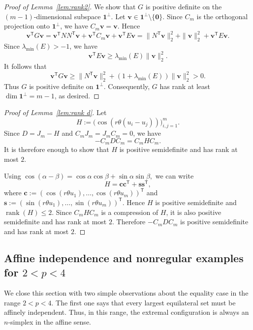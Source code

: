 \documentclass[11pt]{article}
\theoremstyle{definition}
\begin{document}
\begin{proof}[Proof of Lemma~\ref{lem:rank2}]
We show that \(G\) is positive definite on the \((m-1)\)-dimensional subspace \(\boldsymbol{1}^{\perp}\). Let
\(
\boldsymbol{v}\in\boldsymbol{1}^{\perp}\setminus\{\boldsymbol{0}\}.
\)
Since \(C_m\) is the orthogonal projection onto \(\boldsymbol{1}^{\perp}\), we have \(C_m\boldsymbol{v}=\boldsymbol{v}\). Hence
\[
\boldsymbol{v}^{\mathsf T}G\boldsymbol{v}
=
\boldsymbol{v}^{\mathsf T}NN^{\mathsf T}\boldsymbol{v}
+\boldsymbol{v}^{\mathsf T}C_m\boldsymbol{v}
+\boldsymbol{v}^{\mathsf T}E\boldsymbol{v}
=
\|N^{\mathsf T}\boldsymbol{v}\|_2^2+\|\boldsymbol{v}\|_2^2+\boldsymbol{v}^{\mathsf T}E\boldsymbol{v}.
\]
Since \(\lambda_{\min}(E)>-1\), we have
\[
\boldsymbol{v}^{\mathsf T}E\boldsymbol{v}
\ge
\lambda_{\min}(E)\|\boldsymbol{v}\|_2^2.
\]
It follows that
\[
\boldsymbol{v}^{\mathsf T}G\boldsymbol{v}
\ge
\|N^{\mathsf T}\boldsymbol{v}\|_2^2+
(1+\lambda_{\min}(E))\|\boldsymbol{v}\|_2^2
>0.
\]
Thus \(G\) is positive definite on \(\boldsymbol{1}^{\perp}\). Consequently, \(G\) has rank at least \(\dim\boldsymbol{1}^{\perp}=m-1\), as desired.
\end{proof}

\begin{proof}[Proof of Lemma~\ref{lem:rank d}]
Let
\[
H:=\bigl(\cos(r\theta(u_i-u_j))\bigr)_{i,j=1}^m.
\]
Since
\(
D=J_m-H
\)
and \(C_mJ_m=J_mC_m=0\), we have
\[
-C_mDC_m=C_mHC_m.
\]
It is therefore enough to show that \(H\) is positive semidefinite and has rank at most \(2\).

Using
\(
\cos(\alpha-\beta)=\cos\alpha\cos\beta+\sin\alpha\sin\beta,
\)
we can write
\[
H=\boldsymbol{c}\boldsymbol{c}^{\mathsf T}+\boldsymbol{s}\boldsymbol{s}^{\mathsf T},
\]
where
\(
\boldsymbol{c}:=(\cos(r\theta u_1),\dots,\cos(r\theta u_m))^{\mathsf T}
\)
and
\(
\boldsymbol{s}:=(\sin(r\theta u_1),\dots,\sin(r\theta u_m))^{\mathsf T}.
\)
Hence \(H\) is positive semidefinite and \(\operatorname{rank}(H)\le2\). Since \(C_mHC_m\) is a compression of \(H\), it is also positive semidefinite and has rank at most \(2\). Therefore \(-C_mDC_m\) is positive semidefinite and has rank at most \(2\).
\end{proof}


\subsection{Affine independence and nonregular examples for \(2<p<4\)}
We close this section with two simple observations about the equality case in the range \(2<p<4\). The first one says that every largest equilateral set must be affinely independent. Thus, in this range, the extremal configuration is always an \(n\)-simplex in the affine sense.
\end{document}

